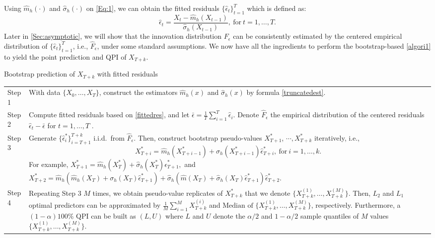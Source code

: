 \documentclass[a4paper]{article}
\begin{document}
Using  $\widehat{m}_h(\cdot)$ and $\widehat{\sigma}_h(\cdot)$
on \cref{Eq:1}, we can  obtain the fitted residuals $\{\hat{\epsilon}_{t}\}_{t=1}^{T}$ which is defined as:
\begin{equation}\label{fittedres}
    \hat{\epsilon}_{t} = \frac{X_t - \widehat{m}_h(X_{t-1})}{\widehat{\sigma}_h(X_{t-1})},~\text{for}~t = 1,\ldots,T.
\end{equation}
Later in \cref{Sec:asymptotic}, we will show that the innovation distribution $F_{\epsilon}$ can be consistently estimated by the centered empirical distribution of $\{\hat{\epsilon}_{t}\}_{t=1}^{T}$, i.e., $\widehat{F}_{\epsilon}$, under some standard assumptions. 
We now have all the ingredients to perform the bootstrap-based \cref{algori1} to yield the point prediction and QPI of $X_{T+k}$.
\begin{algorithm}[htbp]
\caption{Bootstrap prediction of $X_{T+k}$ with fitted residuals} 
\label{algori1}
  \begin{tabularx}{\textwidth}{lX}   
    Step 1 & With data $\{X_{0},\ldots,X_{T}\}$, construct the estimators $\widehat{m}_h(x)$ and $\widehat{\sigma}_h(x)$ by formula \cref{truncatedest}. \\
    Step 2 & Compute fitted residuals based on \cref{fittedres}, and
let $\bar{\epsilon}= \frac{1}{T}\sum_{i=1}^{T}\hat{\epsilon}_i$.  
Denote $\widehat{F}_{\epsilon}$  the empirical distribution of the
centered residuals $\hat{\epsilon}_t -\bar{\epsilon}
$ for $ t= 1,\ldots,T$ .\\
    Step 3 &   Generate $\{\hat{\epsilon}^*_{i}\}_{i=T+1}^{T+k}$   i.i.d.~from $\widehat{F}_{\epsilon}$. Then, construct bootstrap 
 pseudo-values $X^*_{T+1}$, $\cdots, X^*_{T+k}$   iteratively, i.e.,
    \begin{equation}
            X^*_{T+i} = \widehat{m}_h(X^*_{T+i-1}) + \widehat{\sigma}_h(X^*_{T+i-1})\hat{\epsilon}^*_{T+i},~\text{for}~i = 1,\ldots,k.
    \end{equation}
  For example,   $X^*_{T+1} = \widehat{m}_h(X^*_{T }) + \widehat{\sigma}_h(X^*_{T })\hat{\epsilon}^*_{T+1},$ and 
$X^*_{T+2} = \widehat{m}_h(\widehat{m}_h(X_T)+\sigma_h(X_T)\hat{\epsilon}^*_{T+1}) + \widehat{\sigma}_h(\widehat{m}(X_T)+\widehat{\sigma}_h(X_T)\hat{\epsilon}^*_{T+1})\hat{\epsilon}^*_{T+2}$. \\
    Step 4 & Repeating Step 3 $M$ times, we obtain
pseudo-value replicates of $  X^*_{T+k}$ that we denote 
$\{X_{T+k}^{(1)},\ldots,X_{T+k}^{(M)}\}$. Then, $L_2$ and $L_1$ optimal predictors can be approximated by $\frac{1}{M}\sum_{i = 1}^{M}X_{T+k}^{(i)}$ and $\text{Median of }\{X_{T+k}^{(1)},\ldots,X_{T+k}^{(M)}\}$, respectively. Furthermore, a $(1-\alpha)100$\% QPI can be built 
as $(L,U)$ where $L$ and $U$
denote the $ \alpha/2$ and $ 1-\alpha/2$
sample quantiles of $M$ values $\{X_{T+k}^{(1)},\ldots,X_{T+k}^{(M)}\}$.
  \end{tabularx}
\end{algorithm}
\end{document}
